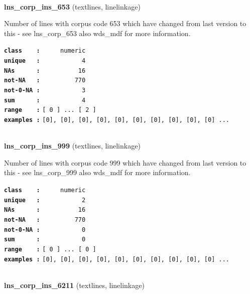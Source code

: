 \documentclass[]{article}
\begin{document}
~

\textbf{lns\_corp\_ins\_653} (textlines, linelinkage)

Number of lines with corpus code 653 which have changed from last
version to this - see lns\_corp\_653 also wds\_mdf for more information.

\textbf{\texttt{class\ \ \ \ :}} \texttt{~~~~~numeric}\\
\textbf{\texttt{unique\ \ \ :}} \texttt{~~~~~~~~~~~4}\\
\textbf{\texttt{NAs\ \ \ \ \ \ :}} \texttt{~~~~~~~~~~16}\\
\textbf{\texttt{not-NA\ \ \ :}} \texttt{~~~~~~~~~770}\\
\textbf{\texttt{not-0-NA\ :}} \texttt{~~~~~~~~~~~3}\\
\textbf{\texttt{sum\ \ \ \ \ \ :}} \texttt{~~~~~~~~~~~4}\\
\textbf{\texttt{range\ \ \ \ :}}
\texttt{{[}\ 0\ {]}\ ...\ {[}\ 2\ {]}}\\
\textbf{\texttt{examples\ :}}
\texttt{{[}0{]},\ {[}0{]},\ {[}0{]},\ {[}0{]},\ {[}0{]},\ {[}0{]},\ {[}0{]},\ {[}0{]},\ {[}0{]},\ {[}0{]}\ ...}\\

~

\textbf{lns\_corp\_ins\_999} (textlines, linelinkage)

Number of lines with corpus code 999 which have changed from last
version to this - see lns\_corp\_999 also wds\_mdf for more information.

\textbf{\texttt{class\ \ \ \ :}} \texttt{~~~~~numeric}\\
\textbf{\texttt{unique\ \ \ :}} \texttt{~~~~~~~~~~~2}\\
\textbf{\texttt{NAs\ \ \ \ \ \ :}} \texttt{~~~~~~~~~~16}\\
\textbf{\texttt{not-NA\ \ \ :}} \texttt{~~~~~~~~~770}\\
\textbf{\texttt{not-0-NA\ :}} \texttt{~~~~~~~~~~~0}\\
\textbf{\texttt{sum\ \ \ \ \ \ :}} \texttt{~~~~~~~~~~~0}\\
\textbf{\texttt{range\ \ \ \ :}}
\texttt{{[}\ 0\ {]}\ ...\ {[}\ 0\ {]}}\\
\textbf{\texttt{examples\ :}}
\texttt{{[}0{]},\ {[}0{]},\ {[}0{]},\ {[}0{]},\ {[}0{]},\ {[}0{]},\ {[}0{]},\ {[}0{]},\ {[}0{]},\ {[}0{]}\ ...}\\

~

\textbf{lns\_corp\_ins\_6211} (textlines, linelinkage)
\end{document}
